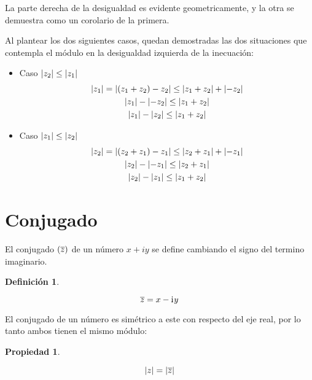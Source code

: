 \documentclass[a5paper,12pt,twoside]{book}
\newtheorem{defn}{{Definición}}[chapter]
\newtheorem{prop}{{Propiedad}}[chapter]
\begin{document}

La parte derecha de la desigualdad es evidente geometricamente, y la otra se demuestra como un corolario de la primera.

Al plantear los dos siguientes casos, quedan demostradas las dos situaciones que contempla el módulo en la desigualdad izquierda de la inecuación:

\begin{itemize}
    \item Caso ${\left| {z_2} \right|} \leq {\left| {z_1} \right|}$
    \begin{gather*}
        {\left| {z_1} \right|} = {\left| {(z_1+z_2)-z_2} \right|} \leq {\left| {z_1+z_2} \right|}+{\left| {-z_2} \right|}
        \\
        {\left| {z_1} \right|} - {\left| {-z_2} \right|} \leq {\left| {z_1+z_2} \right|}
        \\
        {\left| {z_1} \right|} - {\left| {z_2} \right|} \leq {\left| {z_1+z_2} \right|}
    \end{gather*}

    \item Caso ${\left| {z_1} \right|} \leq {\left| {z_2} \right|}$
    \begin{gather*}
        {\left| {z_2} \right|} = {\left| {(z_2+z_1)-z_1} \right|} \leq {\left| {z_2+z_1} \right|}+{\left| {-z_1} \right|}
        \\
        {\left| {z_2} \right|} - {\left| {-z_1} \right|} \leq {\left| {z_2+z_1} \right|}
        \\
        {\left| {z_2} \right|} - {\left| {z_1} \right|} \leq {\left| {z_1+z_2} \right|}
    \end{gather*}
\end{itemize}


\section{Conjugado}

El conjugado $(\overline{z})$ de un número $x+iy$ se define cambiando el signo del termino imaginario.

\begin{mdframed}[style=MyFrame1]
    \begin{defn}
        \label{defn:conjugate}
    \end{defn}
    \begin{equation*}
        \overline{z} = x - \mathrm{i}\mkern1mu y
    \end{equation*}
\end{mdframed}

El conjugado de un número es simétrico a este con respecto del eje real, por lo tanto ambos tienen el mismo módulo:

\begin{mdframed}[style=MyFrame1]
    \begin{prop}
    \end{prop}
    \begin{equation*}
        {\left| {z} \right|} = {\left| {\overline{z}} \right|}
    \end{equation*}
\end{mdframed}
\end{document}
